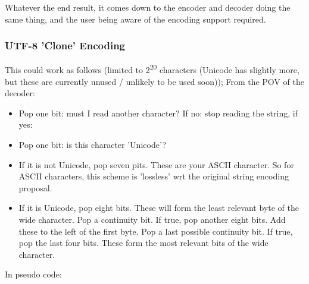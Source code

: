 Whatever the end result, it comes down to the encoder and decoder doing
the same thing, and the user being aware of the encoding support required.

\subsubsection{UTF-8 'Clone' Encoding}

This could work as follows
(limited to 2\textsuperscript{20} characters (Unicode has slightly more,
but these are currently unused / unlikely to be used soon));
From the POV of the decoder:

\begin{itemize}
\item Pop one bit: must I read another character?
      If no: stop reading the string, if yes:
\item Pop one bit: is this character 'Unicode'?
\item If it is not Unicode, pop seven pits. These are your ASCII character.
      So for ASCII characters, this scheme is 'lossless' wrt the
      original string encoding proposal.
\item If it is Unicode, pop eight bits. These will form the least relevant
      byte of the wide character. Pop a continuity bit. If true, pop
      another eight bits. Add these to the left of the first byte.
      Pop a last possible continuity bit. If true, pop the last four bits.
      These form the most relevant bits of the wide character.
\end{itemize}

In pseudo code:

